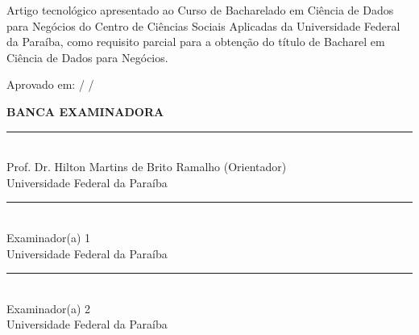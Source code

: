 \documentclass[
    article,
    12pt,
    oneside,
    a4paper,
    english,
    brazilian
    ]{abntex2}
\begin{document}
\vspace{1.5cm}

\hfill\begin{minipage}{0.55\textwidth}
    \small\SingleSpacing
    Artigo tecnológico apresentado ao Curso de Bacharelado em Ciência de Dados para Negócios do Centro de Ciências Sociais Aplicadas da Universidade Federal da Paraíba, como requisito parcial para a obtenção do título de Bacharel em Ciência de Dados para Negócios.
\end{minipage}

\vspace{1.5cm}

\noindent Aprovado em: \underline{\hspace{1cm}} / \underline{\hspace{1cm}} / \underline{\hspace{2cm}}

\vspace{1cm}

\begin{center}
    \textbf{BANCA EXAMINADORA}

    \vspace{1.4cm}
    \rule{0.75\textwidth}{0.4pt} \\
    Prof. Dr. Hilton Martins de Brito Ramalho (Orientador) \\
    Universidade Federal da Paraíba

    \vspace{1.4cm}
    \rule{0.75\textwidth}{0.4pt} \\
    Examinador(a) 1 \\
    Universidade Federal da Paraíba

    \vspace{1.4cm}
    \rule{0.75\textwidth}{0.4pt} \\
    Examinador(a) 2 \\
    Universidade Federal da Paraíba
\end{center}
\newpage
\end{document}
